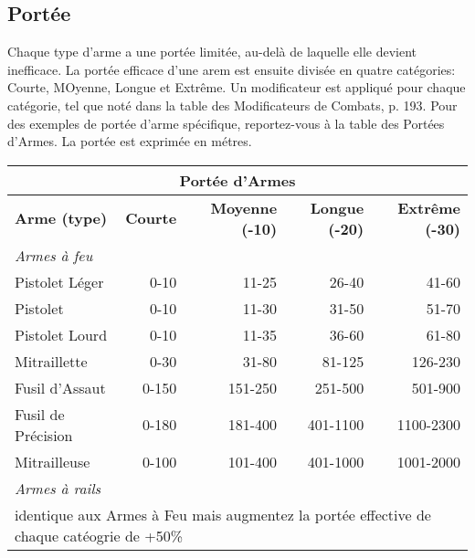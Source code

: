 \subsection{Portée} \label{sec:range} 

Chaque type d'arme a une portée limitée, au-delà de laquelle elle devient inefficace. La portée efficace d'une arem est ensuite divisée en quatre catégories: Courte, MOyenne, Longue et Extrême. Un modificateur est appliqué pour chaque catégorie, tel que noté dans la table des Modificateurs de Combats, p. 193. Pour des exemples de portée d'arme spécifique, reportez-vous à la table des Portées d'Armes. La portée est exprimée en métres. 

\begin{table} \begin{tabularx}{\textwidth}{|X|r|r|r|r|} \hline

\multicolumn{5}{|c|}{\textbf{Portée d'Armes}} \\ \hline

\textbf{Arme (type)} &\textbf{Courte} &\textbf{Moyenne (-10)} &\textbf{Longue (-20)} &\textbf{Extrême (-30)}\\ \hline

\multicolumn{5}{|l|}{\emph{Armes à feu}} \\ \hline

Pistolet Léger	&0-10	&11-25	&26-40	&41-60	\\ \hline

Pistolet	&0-10	&11-30	&31-50	&51-70	\\ \hline

Pistolet Lourd	&0-10	&11-35	&36-60	&61-80	\\ \hline

Mitraillette	&0-30	&31-80	&81-125	&126-230	\\ \hline

Fusil d'Assaut	&0-150	&151-250	&251-500	&501-900	\\ \hline

Fusil de Précision	&0-180	&181-400	&401-1100	&1100-2300	\\ \hline

Mitrailleuse	&0-100	&101-400	&401-1000	&1001-2000	\\ \hline

\multicolumn{5}{|l|}{\emph{Armes à rails}}\\ \hline

\multicolumn{5}{|l|}{identique aux Armes à Feu mais augmentez la portée effective de chaque catéogrie de +50\%} \\ \hline


\end{tabularx}
\end{table}
